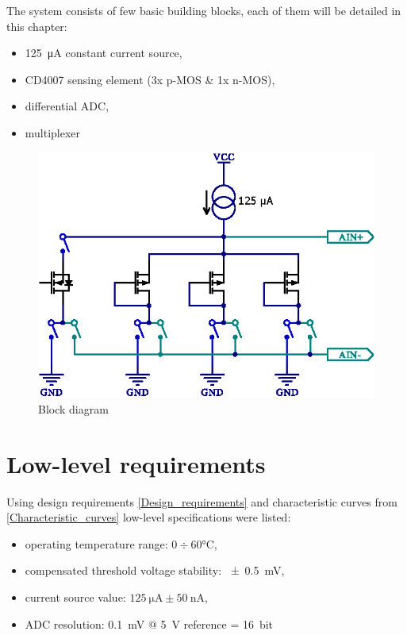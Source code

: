     The system consists of few basic building blocks, each of them will be detailed in this chapter:
    \begin{itemize}
        \item \SI{125}{\uA} constant current source,
        \item CD4007 sensing element (3x p-MOS \& 1x n-MOS),
        \item differential ADC,
        \item multiplexer
    \end{itemize}


    \begin{figure}[H]
        \centering
        \includegraphics[width=0.7\paperwidth]{img/06/CD4007_mux_schematic.eps}
        \caption{Block diagram}
        \label{sensor_block_diagram}
    \end{figure}

\section{Low-level requirements}
    Using design requirements \ref{Design_requirements} and characteristic curves from \ref{Characteristic_curves} low-level specifications were listed:
    \begin{itemize}
        \item operating temperature range: $0 \div 60 \si{\degreeCelsius}$,
        \item compensated threshold voltage stability: \SI{\pm 0.5}{\milli\volt},
        \item current source value: $\SI{125}{\micro\ampere} \pm \SI{50}{\nano\ampere}$,
        \item ADC resolution: \SI{0.1}{\milli\volt} @ \SI{5}{\volt} reference = \SI{16}{bit}
    \end{itemize}


